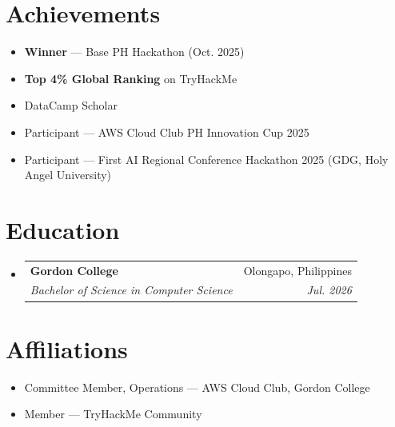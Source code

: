 \documentclass[letterpaper,11pt]{article}
\makeatletter
\newcommand{\resumeItem}[1]{
  \item\small{
    {#1 \vspace{-2pt}}
  }
}
\newcommand{\resumeSubheading}[4]{
  \vspace{-2pt}\item
    \begin{tabular*}{0.97\textwidth}[t]{l@{\extracolsep{\fill}}r}
      \textbf{#1} & #2 \\
      \textit{\small#3} & \textit{\small #4} \\
    \end{tabular*}\vspace{-7pt}
}
\newcommand{\resumeSubHeadingListStart}{\begin{itemize}[leftmargin=0.15in, label={}]}
\newcommand{\resumeSubHeadingListEnd}{\end{itemize}}
\newcommand{\resumeCompactListStart}{\begin{itemize}[leftmargin=0.15in, label={}, itemsep=0pt, parsep=0pt, topsep=2pt]}
\newcommand{\resumeCompactListEnd}{\end{itemize}}
\makeatother
\begin{document}
\section{Achievements}
\resumeCompactListStart
  \resumeItem{\textbf{Winner} --- Base PH Hackathon (Oct. 2025)}
  \resumeItem{\textbf{Top 4\% Global Ranking} on TryHackMe}
  \resumeItem{DataCamp Scholar}
  \resumeItem{Participant --- AWS Cloud Club PH Innovation Cup 2025}
  \resumeItem{Participant --- First AI Regional Conference Hackathon 2025 (GDG, Holy Angel University)}
\resumeCompactListEnd
\vspace{-6pt}

\section{Education}
\resumeSubHeadingListStart
  \resumeSubheading
    {Gordon College}{Olongapo, Philippines}
    {Bachelor of Science in Computer Science}{Jul. 2026}
\resumeSubHeadingListEnd
\vspace{-4pt}

\section{Affiliations}
\resumeCompactListStart
  \resumeItem{Committee Member, Operations --- AWS Cloud Club, Gordon College}
  \resumeItem{Member --- TryHackMe Community}
\resumeCompactListEnd
\end{document}
